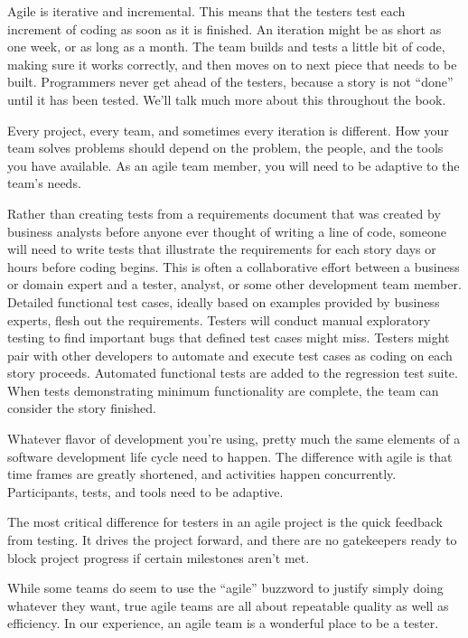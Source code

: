 \documentclass[
	12pt,				%
	openright,			%
	oneside,			%
	a4paper,			%
	english,			%
	brazil,				%
	]{abntex2}
\begin{document}
Agile is iterative and incremental. This means that the testers test each increment of coding as soon as it is finished. An iteration might be as short as one week, or as long as a month. The team builds and tests a little bit of code, making sure it works correctly, and then moves on to next piece that needs to be built. Programmers never get ahead of the testers, because a story is not “done” until it has been tested. We’ll talk much more about this throughout the book.

Every project, every team, and sometimes every iteration is different. How your team solves problems should depend on the problem, the people, and the tools you have available. As an agile team member, you will need to be adaptive to the team’s needs.

Rather than creating tests from a requirements document that was created by business analysts before anyone ever thought of writing a line of code, someone will need to write tests that illustrate the requirements for each story days or hours before coding begins. This is often a collaborative effort between a business or domain expert and a tester, analyst, or some other development team member. Detailed functional test cases, ideally based on examples provided by business experts, flesh out the requirements. Testers will conduct manual exploratory testing to find important bugs that defined test cases might miss. Testers might pair with other developers to automate and execute test cases as coding on each story proceeds. Automated functional tests are added to the regression test suite. When tests demonstrating minimum functionality are complete, the team can consider the story finished.

Whatever flavor of development you’re using, pretty much the same elements of a software development life cycle need to happen. The difference with agile is that time frames are greatly shortened, and activities happen concurrently. Participants, tests, and tools need to be adaptive.

The most critical difference for testers in an agile project is the quick feedback from testing. It drives the project forward, and there are no gatekeepers ready to block project progress if certain milestones aren’t met.

While some teams do seem to use the “agile” buzzword to justify simply doing whatever they want, true agile teams are all about repeatable quality as well as efficiency. In our experience, an agile team is a wonderful place to be a tester.
\end{document}
